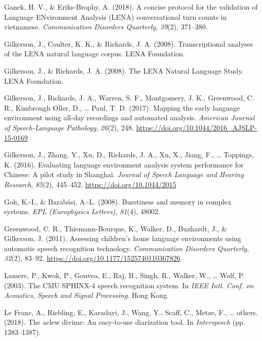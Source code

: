 \documentclass[english,table,man,floatsintext]{apa6}
\begin{document}
\leavevmode\hypertarget{ref-ganek2018concise}{}%
Ganek, H. V., \& Eriks-Brophy, A. (2018). A concise protocol for the validation of Language ENvironment Analysis (LENA) conversational turn counts in vietnamese. \emph{Communication Disorders Quarterly}, \emph{39}(2), 371--380.

\leavevmode\hypertarget{ref-Gilkerson2008ltr6}{}%
Gilkerson, J., Coulter, K. K., \& Richards, J. A. (2008). Transcriptional analyses of the LENA natural language corpus. LENA Foundation.

\leavevmode\hypertarget{ref-gilkerson2008lena}{}%
Gilkerson, J., \& Richards, J. A. (2008). The LENA Natural Language Study. LENA Foundation.

\leavevmode\hypertarget{ref-Gilkerson2017}{}%
Gilkerson, J., Richards, J. A., Warren, S. F., Montgomery, J. K., Greenwood, C. R., Kimbrough Oller, D., \ldots{} Paul, T. D. (2017). Mapping the early language environment using all-day recordings and automated analysis. \emph{American Journal of Speech-Language Pathology}, \emph{26}(2), 248. \url{https://doi.org/10.1044/2016_AJSLP-15-0169}

\leavevmode\hypertarget{ref-Gilkerson2016}{}%
Gilkerson, J., Zhang, Y., Xu, D., Richards, J. A., Xu, X., Jiang, F., \ldots{} Toppings, K. (2016). Evaluating language environment analysis system performance for Chinese: A pilot study in Shanghai. \emph{Journal of Speech Language and Hearing Research}, \emph{85}(2), 445--452. \url{https://doi.org/10.1044/2015}

\leavevmode\hypertarget{ref-goh2008burstiness}{}%
Goh, K.-I., \& Barabási, A.-L. (2008). Burstiness and memory in complex systems. \emph{EPL (Europhysics Letters)}, \emph{81}(4), 48002.

\leavevmode\hypertarget{ref-Greenwood2011}{}%
Greenwood, C. R., Thiemann-Bourque, K., Walker, D., Buzhardt, J., \& Gilkerson, J. (2011). Assessing children's home language environments using automatic speech recognition technology. \emph{Communication Disorders Quarterly}, \emph{32}(2), 83--92. \url{https://doi.org/10.1177/1525740110367826}

\leavevmode\hypertarget{ref-lamere2003cmu}{}%
Lamere, P., Kwok, P., Gouvea, E., Raj, B., Singh, R., Walker, W., \ldots{} Wolf, P. (2003). The CMU SPHINX-4 speech recognition system. In \emph{IEEE Intl. Conf. on Acoustics, Speech and Signal Processing}. Hong Kong.

\leavevmode\hypertarget{ref-le2018aclew}{}%
Le Franc, A., Riebling, E., Karadayi, J., Wang, Y., Scaff, C., Metze, F., \ldots{} others. (2018). The aclew divime: An easy-to-use diarization tool. In \emph{Interspeech} (pp. 1383--1387).
\end{document}

